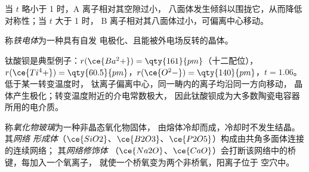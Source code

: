 当 $t$ 略小于 1 时，A 离子相对其空隙过小，
八面体发生倾斜以围拢它，从而降低对称性；当 $t$ 大于 1 时，
B 离子相对其八面体过小，可偏离中心移动。

\begin{definition}[铁电体]\label{def:b3:inorganic-materials:ferroelectric}
称\emph{铁电体}为一种具有自发
电极化、且能被外电场反转的晶体。
\end{definition}

钛酸钡是典型例子：$r(\ce{Ba^2+}) = \qty{161}{pm}$（十二配位），
$r(\ce{Ti^4+}) = \qty{60.5}{pm}$，$r(\ce{O^2-}) = \qty{140}{pm}$，$t = 1.06$。低于某一转变温度时，
钛离子偏离中心，同一畴内的离子均沿同一方向移动，
晶体产生极化；转变温度附近的介电常数极大，
因此钛酸钡成为大多数陶瓷电容器所用的电介质。

\begin{definition}[氧化物玻璃]\label{def:b3:inorganic-materials:glass}
称\emph{氧化物玻璃}为一种非晶态氧化物固体，
由熔体冷却而成，冷却时不发生结晶。其\emph{网络
形成体}（$\ce{SiO2}$、$\ce{B2O3}$、$\ce{P2O5}$）构成由共角多面体连接的连续网络；
其\emph{网络修饰体}
（$\ce{Na2O}$、$\ce{CaO}$）会打断该网络中的桥键，每加入一个氧离子，
就使一个桥氧变为两个非桥氧，阳离子位于
空穴中。
\end{definition}

